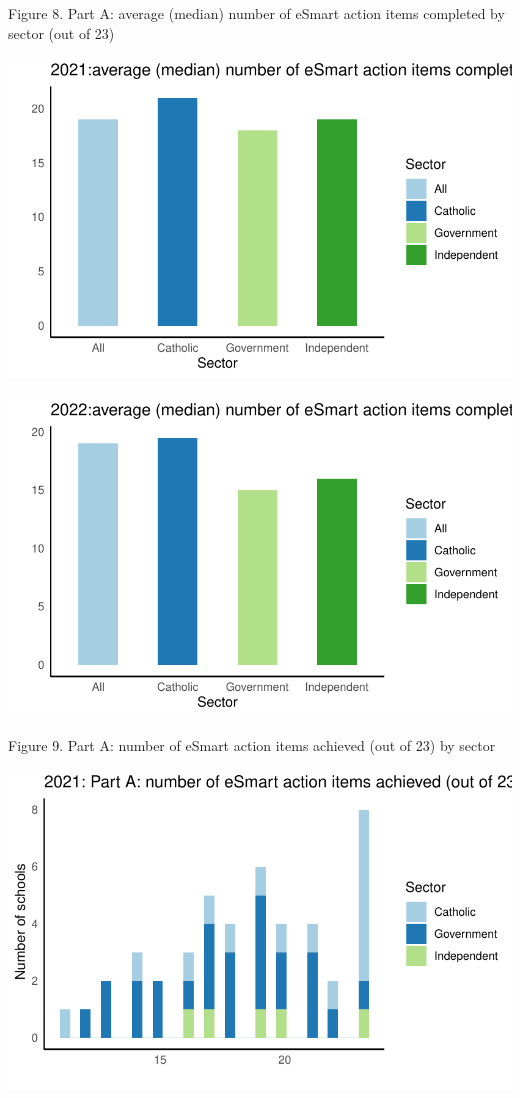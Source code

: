 \documentclass[
  letterpaper,
  DIV=11,
  numbers=noendperiod]{scrartcl}
\begin{document}
Figure 8. Part A: average (median) number of eSmart action items
completed by sector (out of 23)

\includegraphics{report_files/figure-pdf/unnamed-chunk-8-1.pdf}

\includegraphics{report_files/figure-pdf/unnamed-chunk-8-2.pdf}

Figure 9. Part A: number of eSmart action items achieved (out of 23) by
sector

\includegraphics{report_files/figure-pdf/unnamed-chunk-9-1.pdf}
\end{document}
